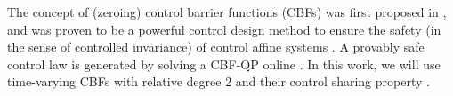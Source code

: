\documentclass[journal,10pt]{IEEEtran}
\newtheorem{definition}{\bfseries Definition}%
\newcommand{\R}{\mathbb{R}}
\newcommand{\C}{\mathcal{C}}
\newcommand{\D}{\mathcal{D}}
\newcommand{\Kzcbf}{K_{\mathrm{zcbf}}}
\begin{document}
The concept of (zeroing)  control barrier functions (CBFs) was first proposed in \cite{Xu2015ADHS}, and was proven to be a powerful control design method to ensure the safety (in the sense of controlled invariance) of control affine systems \cite{ames2016control,xu2018correctness}. A provably safe control law is generated by solving a CBF-QP online \cite{Xu2015ADHS}. In this work, we will use time-varying CBFs with relative degree 2 and their control sharing property \cite{xu2018constrained}. %



\end{document}
